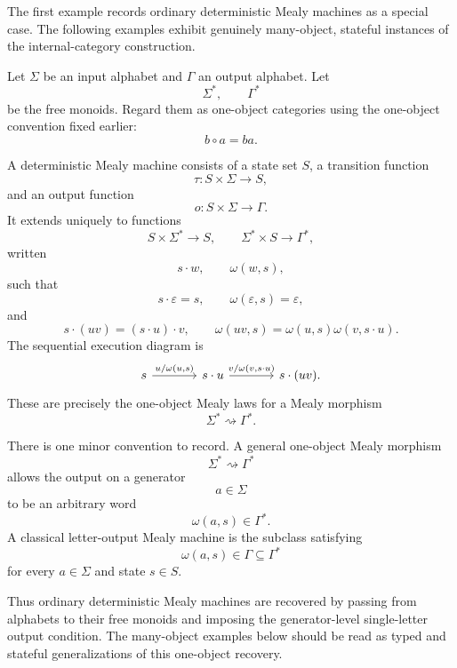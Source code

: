 The first example records ordinary deterministic Mealy machines as a special case. The following examples exhibit genuinely many-object, stateful instances of the internal-category construction.

\begin{example}
\label{example:classical-deterministic-mealy-machines}
    Let \(\Sigma\) be an input alphabet and \(\Gamma\) an output alphabet. Let
    \[
        \Sigma^\ast,
        \qquad
        \Gamma^\ast
    \]
    be the free monoids. Regard them as one-object categories using the one-object convention fixed earlier:
    \[
        b\circ a=ba.
    \]
    
    A deterministic Mealy machine consists of a state set \(S\), a transition function
    \[
        \tau:S\times\Sigma\to S,
    \]
    and an output function
    \[
        o:S\times\Sigma\to\Gamma.
    \]
    It extends uniquely to functions
    \[
        S\times\Sigma^\ast\to S,
        \qquad
        \Sigma^\ast\times S\to\Gamma^\ast,
    \]
    written
    \[
        s\cdot w,
        \qquad
        \omega(w,s),
    \]
    such that
    \[
        s\cdot\varepsilon=s,
        \qquad
        \omega(\varepsilon,s)=\varepsilon,
    \]
    and
    \[
        s\cdot(uv)=(s\cdot u)\cdot v,
        \qquad
        \omega(uv,s)=\omega(u,s)\omega(v,s\cdot u).
    \]
    The sequential execution diagram is
    \[
        \begin{tikzcd}[column sep=large]
                s
                    \arrow[r, "{u/\omega(u,s)}"]
            &
                s\cdot u
                    \arrow[r, "{v/\omega(v,s\cdot u)}"]
            &
                s\cdot(uv).
        \end{tikzcd}
    \]
    These are precisely the one-object Mealy laws for a Mealy morphism
    \[
        \Sigma^\ast\rightsquigarrow\Gamma^\ast.
    \]
    
    There is one minor convention to record. A general one-object Mealy morphism
    \[
        \Sigma^\ast\rightsquigarrow\Gamma^\ast
    \]
    allows the output on a generator
    \[
        a\in\Sigma
    \]
    to be an arbitrary word
    \[
        \omega(a,s)\in\Gamma^\ast.
    \]
    A classical letter-output Mealy machine is the subclass satisfying
    \[
        \omega(a,s)\in\Gamma\subseteq\Gamma^\ast
    \]
    for every \(a\in\Sigma\) and state \(s\in S\).
    
    Thus ordinary deterministic Mealy machines are recovered by passing from alphabets to their free monoids and imposing the generator-level single-letter output condition. The many-object examples below should be read as typed and stateful generalizations of this one-object recovery.
\end{example}

